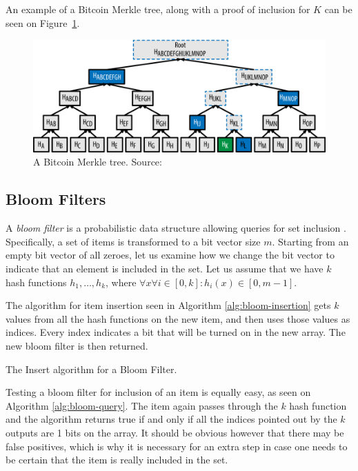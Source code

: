An example of a Bitcoin Merkle tree, along with a proof of inclusion for $K$ can be seen on Figure~\ref{fig:merkletree}.

\begin{figure}
  \centering
  \includegraphics[width=0.9\columnwidth,keepaspectratio]{figures/merkle-tree-proof.png}
  \caption{A Bitcoin Merkle tree. Source:~\cite{mastering}}
  \label{fig:merkletree}
\end{figure}

\subsection{Bloom Filters}
A \textit{bloom filter} is a probabilistic data structure allowing queries for set inclusion \cite{bloom}. Specifically, a set of items is transformed to a bit vector size $m$. Starting from an empty bit vector of all zeroes, let us examine how we change the bit vector to indicate that an element is included in the set. Let us assume that we have $k$ hash functions $h_1, \dots, h_k$, where $\forall x \forall i \in [0, k]: h_i(x) \in [0, m-1]$.

The algorithm for item insertion seen in Algorithm \ref{alg:bloom-insertion} gets $k$ values from all the hash functions on the new item, and then uses those values as indices. Every index indicates a bit that will be turned on in the new array. The new bloom filter is then returned.

\begin{algorithm}[H]
  \caption{\label{alg:bloom-insertion}The \textsf{Insert} algorithm
    for a Bloom Filter.}
    \begin{algorithmic}[1]
        \EndFor
        \State{}
      \EndFunction
    \end{algorithmic}
\end{algorithm}

Testing a bloom filter for inclusion of an item is equally easy, as seen on Algorithm \ref{alg:bloom-query}. The item again passes through the $k$ hash function and the algorithm returns true if and only if all the indices pointed out by the $k$ outputs are 1 bits on the array. It should be obvious however that there may be false positives, which is why it is necessary for an extra step in case one needs to be certain that the item is really included in the set.


